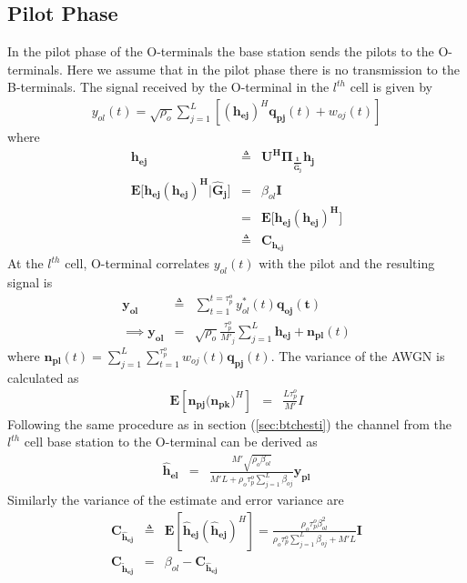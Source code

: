 \documentclass[10pt, a4paper, twoside,fleqn]{article}
\begin{document}
\subsection{Pilot Phase}
	In the pilot phase of the O-terminals the base station sends the pilots to the O-terminals. Here we assume that in the pilot phase there is no transmission to the B-terminals.
The signal received by the O-terminal in the $l^{th}$ cell is given by
\begin{eqnarray}
	y_{ol}(t)=\sqrt{\rho_o} \sum_{j=1}^{L} \left[(\mathbf{h_{ej}})^H \mathbf{q_{pj}}(t) + w_{oj}(t) \right]
\end{eqnarray}
where
\begin{eqnarray}
	\mathbf{h_{ej}} &\triangleq& \mathbf{U^H\Pi_{\frac{1}{\hat G_j}}h_j} \nonumber \\
        \mathbf{E[h_{ej}(h_{ej})^H|\hat G_j}] &=& \beta_{ol}\mathbf{I} \nonumber \\
			                     &=& \mathbf{E[h_{ej}(h_{ej})^H}] \nonumber \\
                                           &\triangleq& \mathbf{C_{h_{ej}}} \nonumber
\end{eqnarray}
At the $l^{th}$ cell, O-terminal correlates $y_{ol}(t)$ with the pilot and the resulting signal is
\begin{eqnarray}
	\mathbf{y_{ol}} &\triangleq& \sum_{t=1}^{t=\tau_p^o} y_{ol}^*(t)\mathbf{q_{oj}(t)} \nonumber \\
\implies \mathbf{y_{ol}} &=& \sqrt{\rho_o}\frac{\tau_p^o}{M'_j}\sum_{j=1}^{L}\mathbf{h_{ej}}+\mathbf{n_{pl}}(t)
\end{eqnarray}
where $\mathbf{n_{pl}}(t) = \sum_{j=1}^{L} \sum_{t=1}^{\tau_p^o} w_{oj}(t) \mathbf{q_{pj}}(t)$. The variance of the AWGN is calculated as
\begin{eqnarray*}
	\mathbf{E}[\mathbf{n_{pj}(n_{pk}})^H] &=& \frac{L\tau_p^o}{M'}I 
\end{eqnarray*}
Following the same procedure as in section (\ref{sec:btchesti}) the channel from the $l^{th}$ cell base station to the O-terminal can be derived as 
\begin{eqnarray}\label{eqn:otchesti}
	\mathbf{\hat h_{el}} &=& \frac{M'\sqrt{\rho_o\beta_{ol}}}{M'L+\rho_o\tau_p^o\sum_{j=1}^{L}\beta_{oj}}\mathbf{y_{pl}}
\end{eqnarray}
Similarly the variance of the estimate and error variance are
\begin{eqnarray}
	\mathbf{C_{\hat h_{ej}}} &\triangleq& \mathbf{E}[\mathbf{\hat h_{ej}}(\mathbf{\hat h_{ej}})^H] = \frac{\rho_o\tau_p^o\beta^2_{ol}}{\rho_o\tau_p^o\sum_{j=1}^{L}\beta_{oj}+M'L}\mathbf{I} \\
	\mathbf{C_{\widetilde{h}_{ej}}} &=& \beta_{ol} - \mathbf{C_{\hat h_{ej}}} 
\end{eqnarray}
\end{document}
